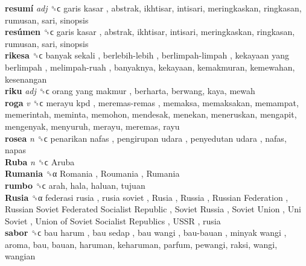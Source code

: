 \textbf{resumí} \emph{adj}  ␝ϲ   garis kasar , abstrak, ikhtisar, intisari, meringkaskan, ringkasan, rumusan, sari, sinopsis  \\
\textbf{resúmen} ␝ϲ   garis kasar , abstrak, ikhtisar, intisari, meringkaskan, ringkasan, rumusan, sari, sinopsis  \\
\textbf{rikesa} ␝ϲ   banyak sekali ,  berlebih-lebih ,  berlimpah-limpah ,  kekayaan yang berlimpah ,  melimpah-ruah , banyaknya, kekayaan, kemakmuran, kemewahan, kesenangan  \\
\textbf{riku} \emph{adj}  ␝ϲ   orang yang makmur , berharta, berwang, kaya, mewah  \\
\textbf{roga} \emph{v}  ␝ϲ   merayu kpd ,  meremas-remas , memaksa, memaksakan, memampat, memerintah, meminta, memohon, mendesak, menekan, meneruskan, mengapit, mengenyak, menyuruh, merayu, meremas, rayu  \\
\textbf{rosea} \emph{n}  ␝ϲ   penarikan nafas ,  pengirupan udara ,  penyedutan udara , nafas, napas  \\
\textbf{Ruba} \emph{n}  ␝ϲ   Aruba   \\
\textbf{Rumania} ␝α   Romania ,  Roumania ,  Rumania   \\
\textbf{rumbo} ␝ϲ  arah, hala, haluan, tujuan  \\
\textbf{Rusia} ␝α   federasi rusia ,  rusia soviet ,  Rusia ,  Russia ,  Russian Federation ,  Russian Soviet Federated Socialist Republic ,  Soviet Russia ,  Soviet Union ,  Uni Soviet ,  Union of Soviet Socialist Republics ,  USSR , rusia  \\
\textbf{sabor} ␝ϲ   bau harum ,  bau sedap ,  bau wangi ,  bau-bauan ,  minyak wangi , aroma, bau, bauan, haruman, keharuman, parfum, pewangi, raksi, wangi, wangian  \\

